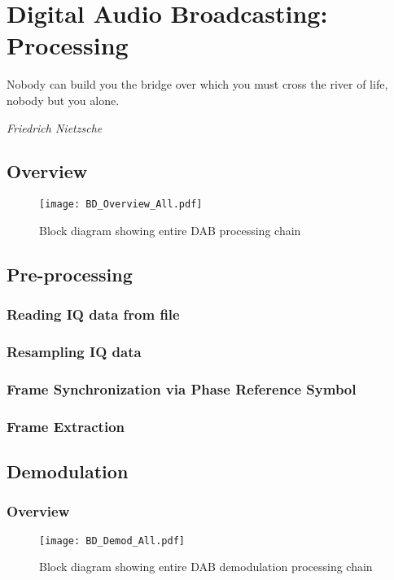 \documentclass[class=report,11pt,crop=false]{standalone}
\begin{document}
\chapter{Digital Audio Broadcasting: Processing}
\epigraph{Nobody can build you the bridge over which you must cross the river of life, nobody but you alone.}%
    {\emph{Friedrich Nietzsche}}

\section{Overview}

\begin{figure}[htbp]
    \centering
    \texttt{[image: BD\_Overview\_All.pdf]}
    \caption{Block diagram showing entire DAB processing chain}
    \label{fig:BD_Overview_All}
\end{figure}

\section{Pre-processing}
\subsection{Reading IQ data from file}
\subsection{Resampling IQ data}
\subsection{Frame Synchronization via Phase Reference Symbol}
\subsection{Frame Extraction}

\section{Demodulation}
\subsection{Overview}

\begin{figure}[htbp]
    \centering
    \texttt{[image: BD\_Demod\_All.pdf]}
    \caption{Block diagram showing entire DAB demodulation processing chain}
    \label{fig:BD_Demod_All}
\end{figure}
\end{document}
